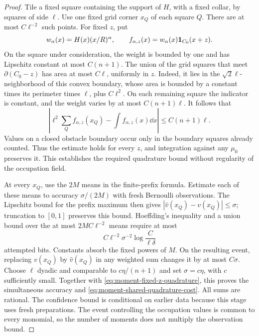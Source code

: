 \begin{proof}
Tile a fixed square containing the support of $H$, with a fixed
collar, by squares of side $\ell$.  Use one fixed grid corner
$x_Q$ of each square $Q$.  There are at most $C\ell^{-2}$ such
points.  For fixed $z$, put
\[
 w_\alpha(x)=H(x)(x/R)^\alpha,
 \qquad
 f_{\alpha,z}(x)=w_\alpha(x)\mathbf 1_{C_0}(x+z).
\]
On the square under consideration, the weight is bounded by one
and has Lipschitz constant at most $C(n+1)$.  The union of the
grid squares that meet $\partial(C_0-z)$ has area at most
$C\ell$, uniformly in $z$.  Indeed, it lies in the
$\sqrt2\ell$-neighborhood of this convex boundary, whose area is
bounded by a constant times its perimeter times $\ell$, plus
$C\ell^2$.  On each remaining square the indicator is constant,
and the weight varies by at most $C(n+1)\ell$.  It follows that
\begin{equation}\label{eq:moment-fixed-z-quadrature}
 \left|\ell^2\sum_Q f_{\alpha,z}(x_Q)
                   -\int f_{\alpha,z}(x)\dd x\right|
                       \le C(n+1)\ell.
\end{equation}
Values on a closed obstacle boundary occur only in the boundary
squares already counted.  Thus the estimate holds for every $z$,
and integration against any $\mu_0$ preserves it.  This establishes
the required quadrature bound without regularity of the occupation
field.

At every $x_Q$, use the $2M$ means in the finite-prefix formula.
Estimate each of these means to accuracy $\sigma/(2M)$ with fresh
Bernoulli observations.  The Lipschitz bound for the prefix maximum
then gives $|\widehat v(x_Q)-v(x_Q)|\le\sigma$; truncation to
$[0,1]$ preserves this bound.  Hoeffding's inequality and a union
bound over the at most $2MC\ell^{-2}$ means require at most
\[
 C\ell^{-2}\sigma^{-2}\log\frac{C}{\ell\delta}
\]
attempted bits.  Constants absorb the fixed powers of $M$.
On the resulting event, replacing $v(x_Q)$ by $\widehat v(x_Q)$
in any weighted sum changes it by at most $C\sigma$.
Choose $\ell$ dyadic and comparable to $c\eta/(n+1)$ and set
$\sigma=c\eta$, with $c$ sufficiently small.  Together with
\eqref{eq:moment-fixed-z-quadrature}, this proves the simultaneous
accuracy and \eqref{eq:moment-shared-quadrature-cost}.  All sums
are rational.  The confidence bound is conditional on earlier data
because this stage uses fresh preparations.  The event controlling
the occupation values is common to every monomial, so the number
of moments does not multiply the observation bound.
\end{proof}


